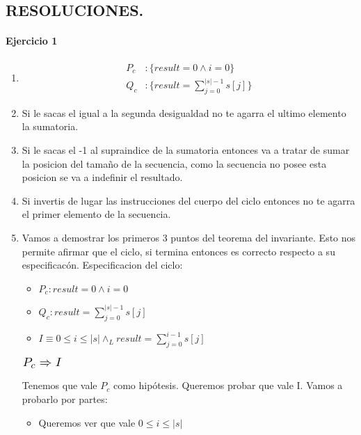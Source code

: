 \documentclass{article}
\begin{document}


\begin{center}
\section*{RESOLUCIONES.}
\end{center}

\paragraph{Ejercicio 1}
\begin{enumerate}[label=\alph*)]
\item
	\begin{align*}
		P_c&: \{result=0\wedge i=0\}\\
		Q_c&: \{result=\sum_{j=0}^{|s|-1}s[j]\}
	\end{align*}
\item Si le sacas el igual a la segunda desigualdad no te agarra el ultimo elemento la 
	sumatoria.
\item Si le sacas el -1 al supraindice de la sumatoria entonces va a tratar de sumar la posicion del tamaño
	de la secuencia, como la secuencia no posee esta posicion se va a indefinir el resultado.
\item Si invertis de lugar las instrucciones del cuerpo del ciclo entonces no te agarra el primer elemento de la 
secuencia.
\item 
	Vamos  a demostrar los primeros 3 puntos del teorema del invariante. Esto nos permite afirmar que el ciclo, si termina entonces
	es correcto respecto a su especificacón. Especificacion del ciclo:
	\begin{itemize}
		\item $P_c: result=0 \wedge i=0$
		\item $Q_c:r esult=\sum_{j=0}^{|s|-1}s[j] $
		\item $I\equiv 0\leq i\leq |s| \wedge_L result=\sum_{j=0}^
			{i-1}s[j]$
	\end{itemize}
	\begin{flushleft}$\scalebox{1.3}{$P_c\Rightarrow I$}$\end{flushleft}
	Tenemos que vale $P_c$ como hipótesis. Queremos probar que vale I. Vamos a probarlo por partes:
	\begin{itemize}
		\item Queremos ver que vale $ 0\leq i\leq |s|$\smallskip \\

\end{itemize}
\end{enumerate}
\end{document}
